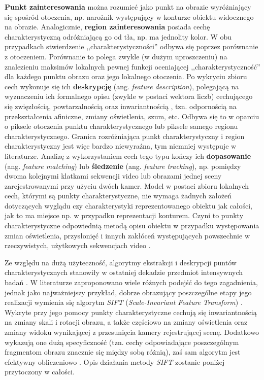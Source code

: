 \textbf{Punkt zainteresowania} można rozumieć jako punkt na obrazie wyróżniający się spośród otoczenia, np. narożnik występujący w konturze obiektu widocznego na obrazie. Analogicznie, \textbf{region zainteresowania} posiada cechę charakterystyczną odróżniającą go od tła, np. ma jednolity kolor. W obu przypadkach stwierdzenie ,,charakterystyczności'' odbywa się poprzez porównanie z otoczeniem. Porównanie to polega zwykle (w dużym uproszczeniu) na znalezieniu maksimów lokalnych pewnej funkcji oceniającej ,,charakterystyczność'' dla każdego punktu obrazu oraz jego lokalnego otoczenia. Po wykryciu zbioru cech wykonuje się ich \textbf{deskrypcję} (ang. \textit{feature description}), polegającą na wyznaczeniu ich formalnego opisu (zwykle w postaci wektora liczb) cechującego się zwięzłością, powtarzalnością oraz inwariantnością \cite{Szeliski2011}, tzn. odpornością na przekształcenia afiniczne, zmiany oświetlenia, szum, etc. Odbywa się to w oparciu o piksele otoczenia punktu charakterystycznego lub piksele samego regionu charakterystycznego. Granica rozróżniająca punkt charakterystyczny i region charakterystyczny jest więc bardzo niewyraźna, tym niemniej występuje w literaturze. Analizę z wykorzystaniem cech tego typu kończy ich \textbf{dopasowanie} (ang. \textit{feature matching}) lub \textbf{śledzenie} (ang. \textit{feature tracking}), np. pomiędzy dwoma kolejnymi klatkami sekwencji video lub obrazami jednej sceny zarejestrowanymi przy użyciu dwóch kamer. Model w postaci zbioru lokalnych cech, którymi są punkty charakterystyczne, nie wymaga żadnych założeń dotyczących wyglądu czy charakterystyki reprezentowanego obiektu jak całości, jak to ma miejsce np. w przypadku reprezentacji konturem. Czyni to punkty charakterystyczne odpowiednią metodą opisu obiektu w przypadku występowania zmian oświetlenia, przysłonięć i innych zakłóceń występujących powszechnie w rzeczywistych, użytkowych sekwencjach video \cite{Treiber2010}.

Ze względu na dużą użyteczność, algorytmy ekstrakcji i deskrypcji puntów charakterystycznych stanowiły w ostatniej dekadzie przedmiot intensywnych badań \cite{Treiber2010}. W literaturze zaproponowano wiele różnych podejść do tego zagadnienia, jednak jako najważniejszy przykład, dobrze obrazujący poszczególne etapy jego realizacji wymienia się algorytm \textit{SIFT} (\textit{Scale-Invariant Feature Transform}) \cite{Treiber2010} \cite{Szeliski2011}. Wykryte przy jego pomocy punkty charakterystyczne cechują się inwariantnością na zmiany skali i rotacji obrazu, a także częściowo na zmiany oświetlenia oraz zmiany widoku wynikającej z przesunięcia kamery rejestrującej scenę. Dodatkowo wykazują one dużą specyficzność (tzn. cechy odpowiadające poszczególnym fragmentom obrazu znacznie się między sobą różnią), zaś sam algorytm jest efektywny obliczeniowo \cite{Lowe2004}. Opis działania metody \textit{SIFT} zostanie poniżej przytoczony w całości.

